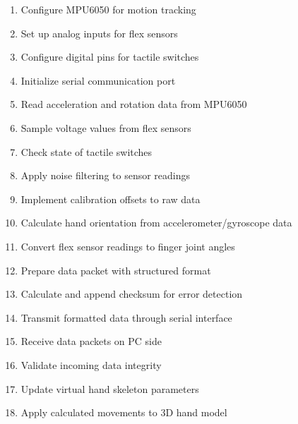 \begin{enumerate}
    \item Configure MPU6050 for motion tracking
    \item Set up analog inputs for flex sensors
    \item Configure digital pins for tactile switches
    \item Initialize serial communication port
    \item Read acceleration and rotation data from MPU6050
    \item Sample voltage values from flex sensors
    \item Check state of tactile switches
    \item Apply noise filtering to sensor readings
    \item Implement calibration offsets to raw data
    \item Calculate hand orientation from accelerometer/gyroscope data
    \item Convert flex sensor readings to finger joint angles
    \item Prepare data packet with structured format
    \item Calculate and append checksum for error detection
    \item Transmit formatted data through serial interface
    \item Receive data packets on PC side
    \item Validate incoming data integrity
    \item Update virtual hand skeleton parameters
    \item Apply calculated movements to 3D hand model
\end{enumerate}

\vspace{1.5\baselineskip}
\newpage


